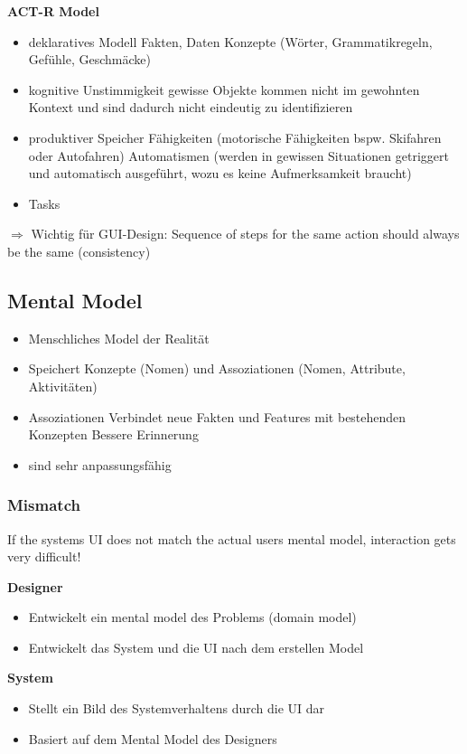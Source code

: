 \documentclass{report}
\theoremstyle{definition}
\theoremstyle{example}
\begin{document}
\textbf{ACT-R Model}
\begin{itemize}
   \item deklaratives Modell
   \subitem Fakten, Daten
   \subitem Konzepte (Wörter, Grammatikregeln, Gefühle, Geschmäcke)
   \item kognitive Unstimmigkeit
   \subitem gewisse Objekte kommen nicht im gewohnten Kontext und sind dadurch nicht eindeutig zu identifizieren  
   \item produktiver Speicher
   \subitem Fähigkeiten (motorische Fähigkeiten bspw. Skifahren oder Autofahren)
   \subitem Automatismen (werden in gewissen Situationen getriggert und automatisch ausgeführt, wozu es keine Aufmerksamkeit braucht)
   \item Tasks 
\end{itemize}
$\Rightarrow$ Wichtig für GUI-Design: Sequence of steps for the same action should always be the same (consistency)

\subsection{Mental Model}
\begin{itemize}
   \item Menschliches Model der Realität
   \item Speichert Konzepte (Nomen) und Assoziationen (Nomen, Attribute, Aktivitäten)
   \item Assoziationen
   \subitem Verbindet neue Fakten und Features mit bestehenden Konzepten
   \subitem Bessere Erinnerung
   \item sind sehr anpassungsfähig
\end{itemize}

\subsubsection{Mismatch}
If the systems UI does not match the actual users mental model, interaction gets very difficult!

\textbf{Designer}
\begin{itemize}
   \item Entwickelt ein mental model des Problems (domain model)
   \item Entwickelt das System und die UI nach dem erstellen Model
\end{itemize}

\textbf{System}
\begin{itemize}
   \item Stellt ein Bild des Systemverhaltens durch die UI dar 
   \item Basiert auf dem Mental Model des Designers
\end{itemize}
\end{document}
